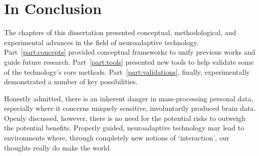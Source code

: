 %
\section*{In Conclusion}%

The chapters of this dissertation presented conceptual, methodological, and experimental advances in the field of neuroadaptive technology. Part~\ref{part:concepts} provided conceptual frameworks to unify previous works and guide future research. Part~\ref{part:tools} presented new tools to help validate some of the technology's core methods. Part~\ref{part:validations}, finally, experimentally demonstrated a number of key possibilities. 

Honestly admitted, there is an inherent danger in mass-processing personal data, especially where it concerns uniquely sensitive, involuntarily produced brain data. Openly discussed, however, there is no need for the potential risks to outweigh the potential benefits. Properly guided, neuroadaptive technology may lead to environments where, through completely new notions of `interaction', our thoughts really do make the world.
